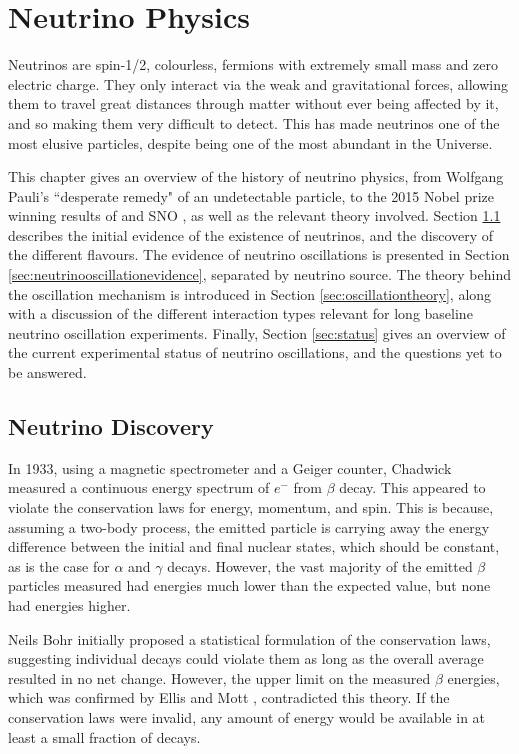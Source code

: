 \chapter{Neutrino Physics}\label{sec:NeutrinoPhysics}

Neutrinos are spin-1/2, colourless, fermions with extremely small mass and zero electric charge. They only interact via the weak and gravitational forces, allowing them to travel great distances through matter without ever being affected by it, and so making them very difficult to detect. This has made neutrinos one of the most elusive particles, despite being one of the most abundant in the Universe. 

This chapter gives an overview of the history of neutrino physics, from Wolfgang Pauli's ``desperate remedy" of an undetectable particle, to the 2015 Nobel prize winning results of \SK \cite{FUKUDA2002179} and SNO \cite{Ahmad_2001}, as well as the relevant theory involved. Section \ref{sec:discovery} describes the initial evidence of the existence of neutrinos, and the discovery of the different flavours. The evidence of neutrino oscillations is presented in Section \ref{sec:neutrinooscillationevidence}, separated by neutrino source. The theory behind the oscillation mechanism is introduced in Section \ref{sec:oscillationtheory}, along with a discussion of the different interaction types relevant for long baseline neutrino oscillation experiments. Finally, Section \ref{sec:status} gives an overview of the current experimental status of neutrino oscillations, and the questions yet to be answered.

\section{Neutrino Discovery}\label{sec:discovery}

In 1933, using a magnetic spectrometer and a Geiger counter, Chadwick \cite{chadwick} measured a continuous energy spectrum of $e^-$ from $\beta$ decay. This appeared to violate the conservation laws for energy, momentum, and spin. This is because, assuming a two-body process, the emitted particle is carrying away the energy difference between the initial and final nuclear states, which should be constant, as is the case for $\alpha$ and $\gamma$ decays. However, the vast majority of the emitted $\beta$ particles measured had energies much lower than the expected value, but none had energies higher.

Neils Bohr initially proposed a statistical formulation of the conservation laws, suggesting individual decays could violate them as long as the overall average resulted in no net change. However, the upper limit on the measured $\beta$ energies, which was confirmed by Ellis and Mott \cite{bethe1934neutrino}, contradicted this theory. If the conservation laws were invalid, any amount of energy would be available in at least a small fraction of decays.

